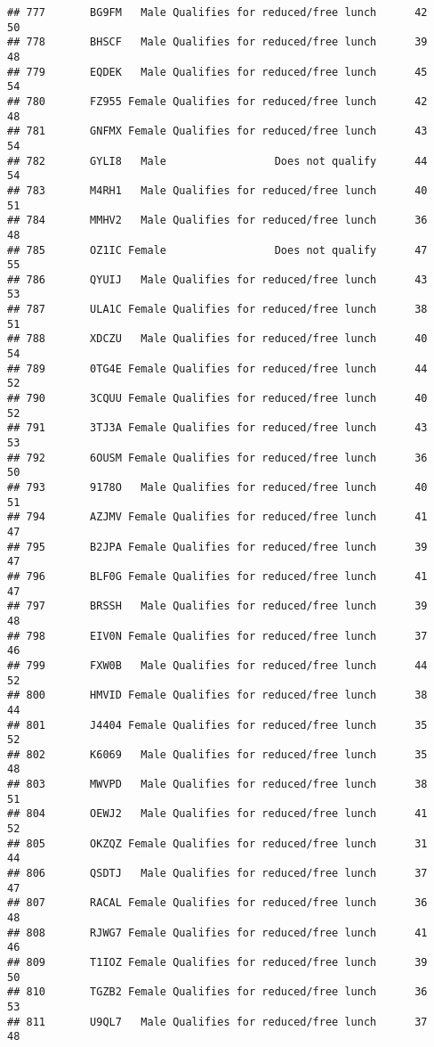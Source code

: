 \documentclass[
]{article}
\begin{document}
\begin{verbatim}
## 777       BG9FM   Male Qualifies for reduced/free lunch      42       50
## 778       BHSCF   Male Qualifies for reduced/free lunch      39       48
## 779       EQDEK   Male Qualifies for reduced/free lunch      45       54
## 780       FZ955 Female Qualifies for reduced/free lunch      42       48
## 781       GNFMX Female Qualifies for reduced/free lunch      43       54
## 782       GYLI8   Male                 Does not qualify      44       54
## 783       M4RH1   Male Qualifies for reduced/free lunch      40       51
## 784       MMHV2   Male Qualifies for reduced/free lunch      36       48
## 785       OZ1IC Female                 Does not qualify      47       55
## 786       QYUIJ   Male Qualifies for reduced/free lunch      43       53
## 787       ULA1C Female Qualifies for reduced/free lunch      38       51
## 788       XDCZU   Male Qualifies for reduced/free lunch      40       54
## 789       0TG4E Female Qualifies for reduced/free lunch      44       52
## 790       3CQUU Female Qualifies for reduced/free lunch      40       52
## 791       3TJ3A Female Qualifies for reduced/free lunch      43       53
## 792       6OUSM Female Qualifies for reduced/free lunch      36       50
## 793       9178O   Male Qualifies for reduced/free lunch      40       51
## 794       AZJMV Female Qualifies for reduced/free lunch      41       47
## 795       B2JPA Female Qualifies for reduced/free lunch      39       47
## 796       BLF0G Female Qualifies for reduced/free lunch      41       47
## 797       BRSSH   Male Qualifies for reduced/free lunch      39       48
## 798       EIV0N Female Qualifies for reduced/free lunch      37       46
## 799       FXW0B   Male Qualifies for reduced/free lunch      44       52
## 800       HMVID Female Qualifies for reduced/free lunch      38       44
## 801       J4404 Female Qualifies for reduced/free lunch      35       52
## 802       K6069   Male Qualifies for reduced/free lunch      35       48
## 803       MWVPD   Male Qualifies for reduced/free lunch      38       51
## 804       OEWJ2   Male Qualifies for reduced/free lunch      41       52
## 805       OKZQZ Female Qualifies for reduced/free lunch      31       44
## 806       QSDTJ   Male Qualifies for reduced/free lunch      37       47
## 807       RACAL Female Qualifies for reduced/free lunch      36       48
## 808       RJWG7 Female Qualifies for reduced/free lunch      41       46
## 809       T1IOZ Female Qualifies for reduced/free lunch      39       50
## 810       TGZB2 Female Qualifies for reduced/free lunch      36       53
## 811       U9QL7   Male Qualifies for reduced/free lunch      37       48

\end{verbatim}
\end{document}
